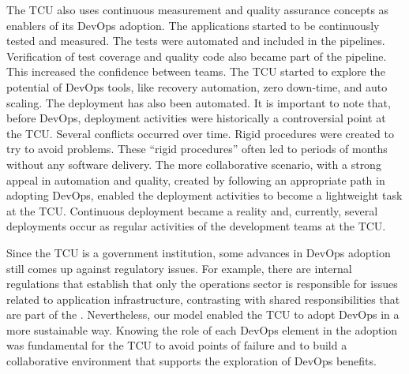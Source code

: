 The TCU also uses continuous measurement and quality assurance concepts as
enablers of its DevOps adoption. The applications started to be continuously
tested and measured. The tests were automated and included in the pipelines.
Verification of test coverage and quality code also became part of the pipeline.
This increased the confidence between teams. The TCU started
to explore the potential of DevOps tools, like recovery automation, zero
down-time, and auto scaling. The deployment has also been automated.
It is important to note that, before DevOps, deployment activities were historically a controversial point at the TCU.
Several conflicts occurred over time. Rigid procedures were created to try to
avoid problems. These ``rigid procedures'' often led to periods of months
without any software delivery. The more collaborative scenario, with a strong appeal in automation and quality,
created by following an appropriate path in adopting DevOps, enabled the deployment activities to become
a lightweight task at the TCU. Continuous deployment became a reality and, currently, several deployments
occur as regular activities of the development teams at the TCU.

Since the TCU is a government institution, some advances in DevOps adoption still comes up
against regulatory issues. For example, there are internal regulations that
establish that only the operations sector is responsible for issues related to
application infrastructure, contrasting with shared responsibilities that are
part of the \cc. Nevertheless, our model enabled the TCU to adopt DevOps in a more
sustainable way. Knowing the role
of each DevOps element in the adoption was fundamental for the TCU to avoid points
of failure and to build a collaborative environment that supports the
exploration of DevOps benefits.
